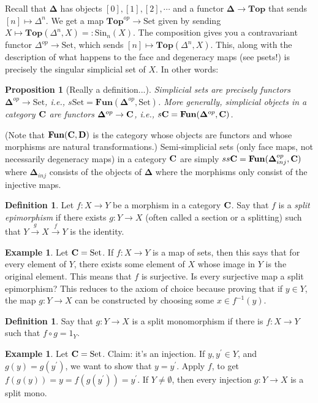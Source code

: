 \documentclass{amsart}
\theoremstyle{theorem}
\newtheorem{prop}[theorem]{Proposition}
\theoremstyle{definition}
\newtheorem{definition}[theorem]{Definition}
\newtheorem{example}[theorem]{Example}
\newcommand{\set}{{\mathrm{Set}}}
\newcommand{\Deltab}{{\mathbf \Delta}}
\newcommand{\Sin}{\mathrm{Sin}}
\begin{document}
Recall that $\Deltab$ has objects $[0],[1],[2],\cdots$ and a functor $\Deltab\to\mathbf{Top}$ that sends $[n]\mapsto\Delta^n$. We get a map $\mathbf{Top}^{op}\to\set$ given by sending $X\mapsto\mathbf{Top}(\Delta^n,X)=:\Sin_n(X)$. The composition gives you a contravariant functor $\Delta^{op}\to\set$, which sends $[n]\mapsto\mathbf{Top}(\Delta^n,X)$. This, along with the description of what happens to the face and degeneracy maps (see psets!) is precisely the singular simplicial set of $X$. In other words:
\begin{prop}[Really a definition...]
Simplicial sets are precisely functors $\Deltab^{op}\to\set$, i.e., $s\set=\mathbf{Fun}(\Deltab^{op},\set)$. More generally, simplicial objects in a category $\mathbf C$ are functors $\Deltab^{op}\to\cc$, i.e., $s\cc=\mathbf{Fun}(\Deltab^{op},\cc)$.
\end{prop}
(Note that $\mathbf{Fun}(\mathbf C,\mathbf D)$ is the category whose objects are functors and whose morphisms are natural transformations.) Semi-simplicial sets (only face maps, not necessarily degeneracy maps) in a category $\mathbf C$ are simply $ss\cc=\mathbf{Fun}(\Deltab^{op}_{inj},\cc)$ where $\Deltab_{inj}$ consists of the objects of $\Deltab$ where the morphisms only consist of the injective maps.
\begin{definition}
Let $f:X\to Y$ be a morphism in a category $\mathbf C$. Say that $f$ is a \textit{split epimorphism} if there exists $g:Y\to X$ (often called a section or a splitting) such that $Y\xrightarrow{g}X\xrightarrow{f}Y$ is the identity.
\end{definition}
\begin{example}
Let $\cc=\set$. If $f:X\to Y$ is a map of sets, then this says that for every element of $Y$, there exists some element of $X$ whose image in $Y$ is the original element. This means that $f$ is surjective. Is every surjective map a split epimorphism? This reduces to the axiom of choice because proving that if $y\in Y$, the map $g:Y\to X$ can be constructed by choosing some $x\in f^{-1}(y)$.
\end{example}
\begin{definition}
Say that $g:Y\to X$ is a split monomorphism if there is $f:X\to Y$ such that $f\circ g=1_Y$.
\end{definition}
\begin{example}
Let $\cc=\set$. Claim: it's an injection. If $y,y^\prime\in Y$, and $g(y)=g(y^\prime)$, we want to show that $y=y^\prime$. Apply $f$, to get $f(g(y))=y=f(g(y^\prime))=y^\prime$. If $Y\neq \emptyset$, then every injection $g:Y\to X$ is a split mono.
\end{example}
\end{document}
